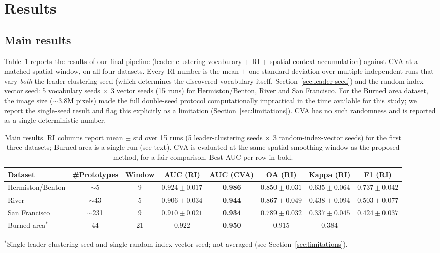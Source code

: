 \documentclass[11pt]{article}
\begin{document}
\section{Results}
\label{sec:results}

\subsection{Main results}

Table~\ref{tab:main} reports the results of our final pipeline (leader-clustering vocabulary + RI + spatial context accumulation) against CVA at a matched spatial window, on all four datasets. Every RI number is the mean $\pm$ one standard deviation over multiple independent runs that vary \emph{both} the leader-clustering seed (which determines the discovered vocabulary itself, Section~\ref{sec:leader-seed}) and the random-index-vector seed: 5 vocabulary seeds $\times$ 3 vector seeds (15 runs) for Hermiston/Benton, River and San Francisco. For the Burned area dataset, the image size ($\sim\!3.8$M pixels) made the full double-seed protocol computationally impractical in the time available for this study; we report the single-seed result and flag this explicitly as a limitation (Section~\ref{sec:limitations}). CVA has no such randomness and is reported as a single deterministic number.

\begin{table}[h]
\centering
\caption{Main results. RI columns report mean $\pm$ std over 15 runs (5 leader-clustering seeds $\times$ 3 random-index-vector seeds) for the first three datasets; Burned area is a single run (see text). CVA is evaluated at the same spatial smoothing window as the proposed method, for a fair comparison. Best AUC per row in bold.}
\label{tab:main}
\begin{tabular}{lccccccc}
\toprule
Dataset & \#Prototypes & Window & AUC (RI) & AUC (CVA) & OA (RI) & Kappa (RI) & F1 (RI) \\
\midrule
Hermiston/Benton & $\sim$5   & 9  & $0.924 \pm 0.017$ & \textbf{0.986} & $0.850 \pm 0.031$ & $0.635 \pm 0.064$ & $0.737 \pm 0.042$ \\
River             & $\sim$43  & 5  & $0.906 \pm 0.034$ & \textbf{0.944} & $0.867 \pm 0.049$ & $0.438 \pm 0.094$ & $0.503 \pm 0.077$ \\
San Francisco     & $\sim$231 & 9  & $0.910 \pm 0.021$ & \textbf{0.934} & $0.789 \pm 0.032$ & $0.337 \pm 0.045$ & $0.424 \pm 0.037$ \\
Burned area$^\ast$ & 44  & 21 & $0.922$ & \textbf{0.950} & $0.915$ & $0.384$ & --    \\
\bottomrule
\end{tabular}

\vspace{2pt}
{\footnotesize $^\ast$Single leader-clustering seed and single random-index-vector seed; not averaged (see Section~\ref{sec:limitations}).}
\end{table}
\end{document}
